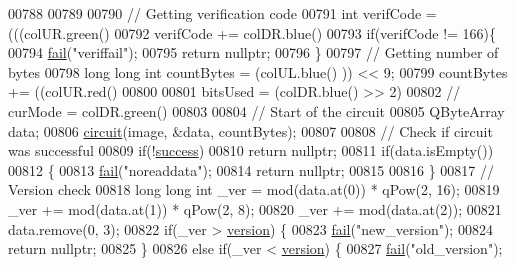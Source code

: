 \begin{DoxyCode}
00788 
00789 
00790     \textcolor{comment}{// Getting verification code}
00791     \textcolor{keywordtype}{int} verifCode = (((colUR.green() %
00792     verifCode += colDR.blue() %
00793     \textcolor{keywordflow}{if}(verifCode != 166)\{
00794         \hyperlink{class_model_p_c_a47464b59b7e37fcee25e55475708aabd}{fail}(\textcolor{stringliteral}{"veriffail"});
00795         \textcolor{keywordflow}{return} \textcolor{keyword}{nullptr};
00796     \}
00797     \textcolor{comment}{// Getting number of bytes}
00798     \textcolor{keywordtype}{long} \textcolor{keywordtype}{long} \textcolor{keywordtype}{int} countBytes = (colUL.blue() %
      )) << 9;
00799     countBytes += ((colUR.red() %
00800 
00801     bitsUsed = (colDR.blue() >> 2) %
00802     \textcolor{comment}{// curMode = colDR.green() %
00803 
00804     \textcolor{comment}{// Start of the circuit}
00805     QByteArray data;
00806     \hyperlink{class_model_p_c_a1d0091062a0c836b283ec2f67411623b}{circuit}(image, &data, countBytes);
00807 
00808     \textcolor{comment}{// Check if circuit was successful}
00809     \textcolor{keywordflow}{if}(!\hyperlink{class_model_p_c_a945ffbbc44a832b953c191debd448f4c}{success})
00810         \textcolor{keywordflow}{return} \textcolor{keyword}{nullptr};
00811     \textcolor{keywordflow}{if}(data.isEmpty())
00812     \{
00813         \hyperlink{class_model_p_c_a47464b59b7e37fcee25e55475708aabd}{fail}(\textcolor{stringliteral}{"noreaddata"});
00814         \textcolor{keywordflow}{return} \textcolor{keyword}{nullptr};
00815 
00816     \}
00817     \textcolor{comment}{// Version check}
00818     \textcolor{keywordtype}{long} \textcolor{keywordtype}{long} \textcolor{keywordtype}{int} \_ver = mod(data.at(0)) * qPow(2, 16);
00819     \_ver += mod(data.at(1)) * qPow(2, 8);
00820     \_ver += mod(data.at(2));
00821     data.remove(0, 3);
00822     \textcolor{keywordflow}{if}(\_ver > \hyperlink{class_model_p_c_a5af48ab89e19be42a94c34ba00249401}{version}) \{
00823         \hyperlink{class_model_p_c_a47464b59b7e37fcee25e55475708aabd}{fail}(\textcolor{stringliteral}{"new\_version"});
00824         \textcolor{keywordflow}{return} \textcolor{keyword}{nullptr};
00825     \}
00826     \textcolor{keywordflow}{else} \textcolor{keywordflow}{if}(\_ver < \hyperlink{class_model_p_c_a5af48ab89e19be42a94c34ba00249401}{version}) \{
00827         \hyperlink{class_model_p_c_a47464b59b7e37fcee25e55475708aabd}{fail}(\textcolor{stringliteral}{"old\_version"});
}
\end{DoxyCode}
